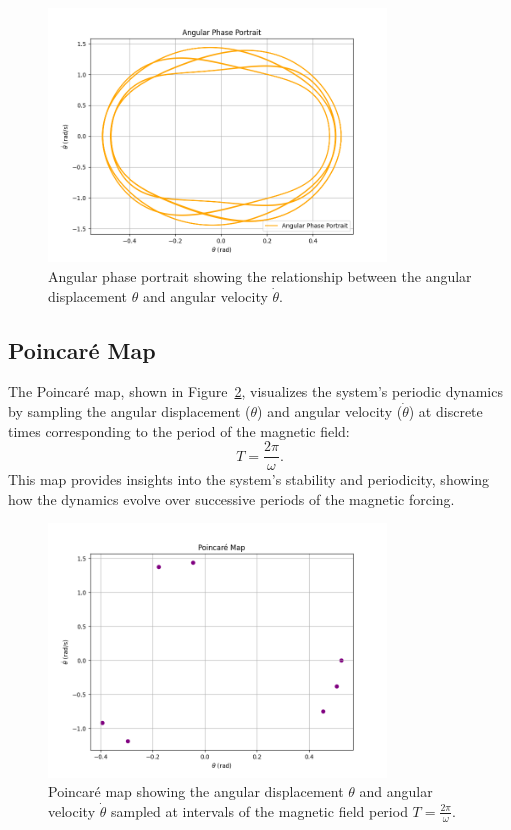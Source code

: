 \documentclass[12pt]{article}
\begin{document}
\begin{figure}[h!]
    \centering
    \includegraphics[width=0.8\textwidth]{angular_phase_portrait.png}
    \caption{Angular phase portrait showing the relationship between the angular displacement \( \theta \) and angular velocity \( \dot{\theta} \).}
    \label{fig:angular_phase_portrait}
\end{figure}

\subsection{Poincaré Map}
The Poincaré map, shown in Figure~\ref{fig:poincare_map}, visualizes the system's periodic dynamics by sampling the angular displacement (\( \theta \)) and angular velocity (\( \dot{\theta} \)) at discrete times corresponding to the period of the magnetic field:
\[
T = \frac{2\pi}{\omega}.
\]
This map provides insights into the system's stability and periodicity, showing how the dynamics evolve over successive periods of the magnetic forcing.

\begin{figure}[h!]
    \centering
    \includegraphics[width=0.8\textwidth]{poincare_map.png}
    \caption{Poincaré map showing the angular displacement \( \theta \) and angular velocity \( \dot{\theta} \) sampled at intervals of the magnetic field period \( T = \frac{2\pi}{\omega} \).}
    \label{fig:poincare_map}
\end{figure}
\end{document}
